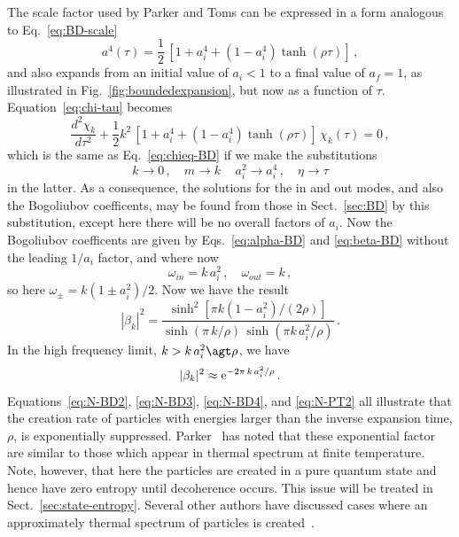 \documentclass[12pt,onecolumn,eqsecnum,floats,aps,prd,floatfix,titlepage,tightenlines]{revtex4-2}
\begin{document}
 The scale factor used by Parker and Toms can be expressed in a form analogous to Eq.~\eqref{eq:BD-scale}
  \begin{equation}
 a^4(\tau) = \frac{1}{2}\, [1 + a_i^4 +(1-a_i^4) \tanh(\rho \tau)]\,,
 \label{eq:PT-scale}
 \end{equation}
and also expands from an initial value of $a_i < 1$ to a final value of $a_f =1$, as illustrated in Fig.~\ref{fig:boundedexpansion},
but now as a function of $\tau$. Equation~\eqref{eq:chi-tau} becomes
\begin{equation}
 {\frac{d^2\chi_k}{d\tau^2}} + \frac{1}{2}  k^2 \,  \left[1 + a_i^4 +(1-a_i^4) \tanh(\rho \tau)\right]\, \chi_{k}(\tau) =0 \, ,
                                                 \label{eq:chieq-PT}
 \end{equation} 
which is the same as Eq.~\eqref{eq:chieq-BD} if we make the substitutions
 \begin{equation}
 k \rightarrow 0\,, \quad m\rightarrow k\, \quad a_i^2   \rightarrow a_i^4\,, \quad  \eta \rightarrow \tau
 \end{equation}
 in the latter.
 As a consequence, the solutions for the in and out modes, and also the Bogoliubov coefficents, may be found 
 from those in Sect.~\ref{sec:BD} by this substitution, except here there will be no overall factors of $a_i$.
 Now the Bogoliubov coefficents are given by Eqs.~\eqref{eq:alpha-BD} and \eqref{eq:beta-BD} without the
 leading $1/a_i$ factor, and where now
 \begin{equation}
 \omega_{in} = k\, a_i^2\,,  \quad \omega_{out} = k\,,
 \label{eq:subs}
 \end{equation}
 so here $\omega_\pm = k (1 \pm a_i^2)/2$.
 Now we have the result
  \begin{equation}
  | \beta_k|^2 = \frac{  \sinh^2[\pi k (1-a_i^2)/(2\rho)]}{ \sinh(\pi\, k/\rho)\, \sinh(\pi k\, a_i^2/\rho)}\,.
 \label{eq:N-PT}
 \end{equation}
 In the high frequency limit, $k > k\, a_i^2 \agt \rho$, we have
  \begin{equation}
  | \beta_k|^2 \approx {\rm e}^{-2 \pi\, k \,a_i^2/\rho}\,.
 \label{eq:N-PT2}
 \end{equation}
 Equations~\eqref{eq:N-BD2}, \eqref{eq:N-BD3}, \eqref{eq:N-BD4}, and \eqref{eq:N-PT2} all illustrate that the creation rate of
 particles with energies larger than the inverse expansion time, $\rho$, is exponentially suppressed. Parker~\cite{Parker76} has
 noted that these exponential factor  are similar to those which appear in thermal spectrum at finite temperature. Note, however,
 that here the particles are created in a pure quantum state and hence have zero entropy until decoherence occurs. This issue  
 will be treated in Sect.~\ref{sec:state-entropy}.  Several other authors have discussed cases where an approximately thermal
 spectrum of particles is created~\cite{HuRaval96,Koks97,Mersini98,Biswas02}.
 
\end{document}
